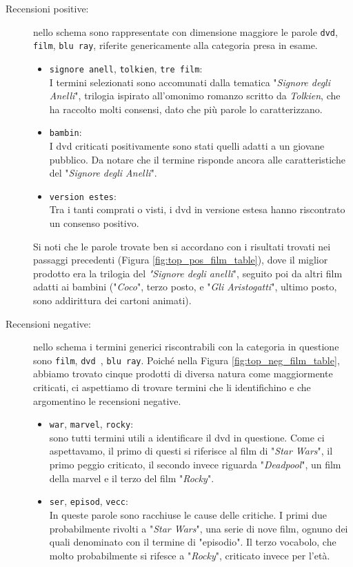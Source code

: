 				\begin{description}
					\item[Recensioni positive:]
					nello schema sono rappresentate con dimensione maggiore le parole \verb|dvd|, \verb|film|, \verb|blu ray|, riferite genericamente alla categoria presa in esame. 	
					\begin{itemize}
						\item \texttt{signore anell}, \texttt{tolkien}, \texttt{tre film}: \\
						I termini selezionati sono accomunati dalla tematica "\textit{Signore degli Anelli}", trilogia ispirato all'omonimo romanzo scritto da \textit{Tolkien}, che ha raccolto molti consensi, dato che più parole lo caratterizzano.
						\item \texttt{bambin}: \\
						I dvd criticati positivamente sono stati quelli adatti a un giovane pubblico. Da notare che il termine risponde ancora alle caratteristiche del "\textit{Signore degli Anelli}".
						\item \texttt{version estes}: \\
						Tra i tanti comprati o visti, i dvd in versione estesa hanno riscontrato un consenso positivo.
					\end{itemize}	
					
					Si noti che le parole trovate ben si accordano con i risultati trovati nei passaggi precedenti (Figura \ref{fig:top_pos_film_table}), dove il miglior prodotto era la trilogia del \textit{"Signore degli anelli}", seguito poi da altri film adatti ai bambini ("\textit{Coco}", terzo posto, e "\textit{Gli Aristogatti}", ultimo posto, sono addirittura dei cartoni animati).
						
					\item[Recensioni negative:] 
					nello schema i termini generici riscontrabili con la categoria in questione sono \verb|film|, \verb|dvd |, \verb|blu ray|. Poiché nella Figura \ref{fig:top_neg_film_table}, abbiamo trovato cinque prodotti di diversa natura come maggiormente criticati, ci aspettiamo di trovare termini che li identifichino e che argomentino le recensioni negative.
					\begin{itemize}
						\item \texttt{war}, \texttt{marvel}, \texttt{rocky}: \\
						sono tutti termini utili a identificare il dvd in questione. Come ci aspettavamo, il primo di questi si riferisce al film di "\textit{Star Wars}", il primo peggio criticato, il secondo invece riguarda "\textit{Deadpool}", un film della marvel e il terzo del film "\textit{Rocky}". 
						\item \texttt{ser}, \texttt{episod}, \texttt{vecc}: \\
						In queste parole sono racchiuse le cause delle critiche. I primi due probabilmente rivolti a "\textit{Star Wars}", una serie di nove film, ognuno dei quali denominato con il termine di "episodio". Il terzo vocabolo, che molto probabilmente si rifesce a "\textit{Rocky}", criticato invece per l'età.		
					\end{itemize}
				\end{description}
			
